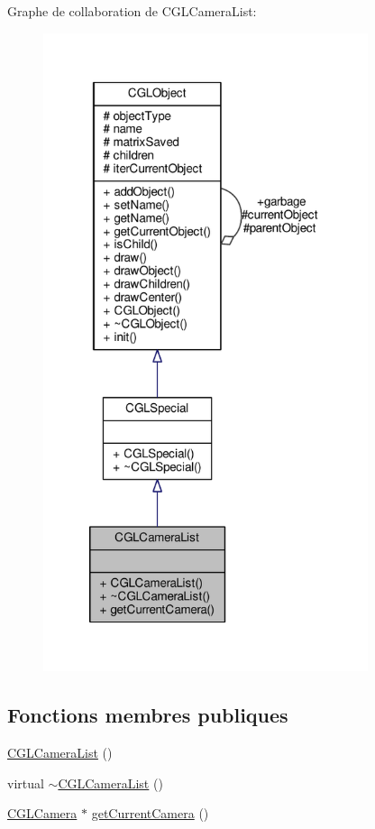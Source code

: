 Graphe de collaboration de C\-G\-L\-Camera\-List\-:\nopagebreak
\begin{figure}[H]
\begin{center}
\leavevmode
\includegraphics[width=270pt]{d7/ddf/class_c_g_l_camera_list__coll__graph}
\end{center}
\end{figure}
\subsection*{Fonctions membres publiques}
\begin{DoxyCompactItemize}
\item 
\hyperlink{class_c_g_l_camera_list_a97edbfb008863a2dc7781e8f13f90a07}{C\-G\-L\-Camera\-List} ()
\item 
virtual \hyperlink{class_c_g_l_camera_list_a713472acd7976a3e3c0629d594177f7c}{$\sim$\-C\-G\-L\-Camera\-List} ()
\item 
\hyperlink{class_c_g_l_camera}{C\-G\-L\-Camera} $\ast$ \hyperlink{class_c_g_l_camera_list_a9733e24181c1d00620aaece73bc71e5e}{get\-Current\-Camera} ()
\end{DoxyCompactItemize}
